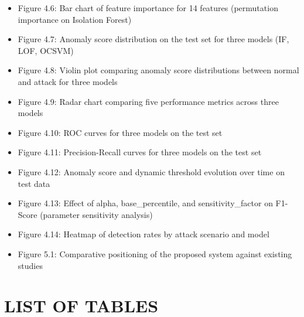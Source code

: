 \documentclass[
  a4paper]{report}
\begin{document}
\begin{itemize}
\item
  Figure 4.6: Bar chart of feature importance for 14 features
  (permutation importance on Isolation Forest)
\item
  Figure 4.7: Anomaly score distribution on the test set for three
  models (IF, LOF, OCSVM)
\item
  Figure 4.8: Violin plot comparing anomaly score distributions between
  normal and attack for three models
\item
  Figure 4.9: Radar chart comparing five performance metrics across
  three models
\item
  Figure 4.10: ROC curves for three models on the test set
\item
  Figure 4.11: Precision-Recall curves for three models on the test set
\item
  Figure 4.12: Anomaly score and dynamic threshold evolution over time
  on test data
\item
  Figure 4.13: Effect of alpha, base\_percentile, and
  sensitivity\_factor on F1-Score (parameter sensitivity analysis)
\item
  Figure 4.14: Heatmap of detection rates by attack scenario and model
\item
  Figure 5.1: Comparative positioning of the proposed system against
  existing studies
\end{itemize}

\section{LIST OF TABLES}\label{list-of-tables}
\end{document}
